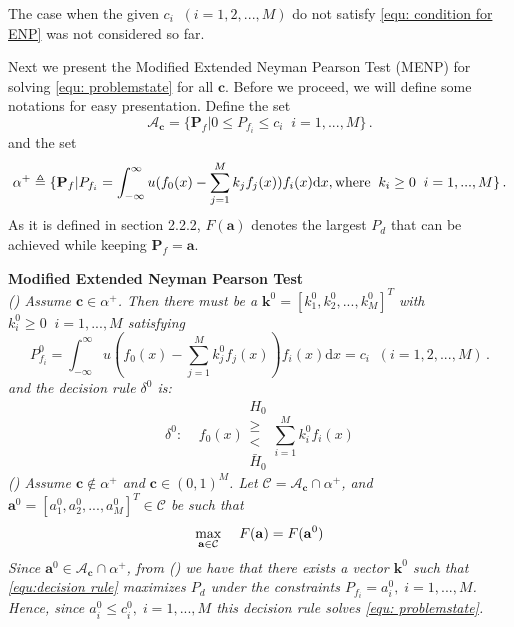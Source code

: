 The case when the given $c_i\;\; (i= 1, 2, ..., M)$ do not satisfy \eqref{equ: condition for ENP} was not considered so far. 


Next we present the Modified Extended Neyman Pearson Test (MENP) for solving \eqref{equ: problemstate} for all $\mathbf{c}$.
Before we proceed, we will define some notations for easy presentation.
Define the set 
\[\mathcal{A}_\mathbf{c} = \{
  \mathbf{P}_f | 0 \leq P_{f_i} \leq c_i
  \;\;i=1,  ..., M\}\,.
\]
and the set 
\[
\alpha^+ \triangleq \{\mathbf{P}_f | P_{f_i} = \int_{-\infty}^{\infty} u(f_0(x) - \sum_{j=1}^{M}k_j f_j(x)) f_i(x) \mathrm{d}x, \text{where\;\;} k_i \geq 0 \;\;i=1, ..., M\}\,.
\]
As it is defined in section 2.2.2, $F(\mathbf{a})$ denotes the largest $P_d$ that can be achieved while keeping $\mathbf{P}_{f} = \mathbf{a}$.  

\noindent \textbf{Modified Extended Neyman Pearson Test}
\noindent \textit{
  \\\textnormal{()} Assume $\mathbf{c} \in \alpha^+$. Then there must be a $\mathbf{k}^0 = [k_1^0, k_2^0, ..., k_M^0]^T$ with $k_i^0 \geq 0\;\;i=1, ..., M$ satisfying
}
\begin{equation}
\label{equ:Pf}
  P_{f_i}^0 = \int_{-\infty}^{\infty} u(f_0(x) - \sum_{j=1}^{M}k_j^0f_j(x))f_i(x)\mathrm{d}x = c_i \;\; (i= 1, 2, ..., M)\,.
\end{equation}
\textit{
    and the decision rule $\delta^0$ is:
}
\begin{equation}
\label{equ:decision rule}
\delta^0:\;\;\;\;f_0(x) \substack{H_0 \\ \geq \\ < \\ \bar{H}_0} \sum_{i=1}^{M}k_i^0f_i(x)
\end{equation}
\textit{
  \noindent \textnormal{()} Assume $\mathbf{c} \notin \alpha^+$ and $\mathbf{c} \in (0, 1)^M$. Let $\mathcal{C} = \mathcal{A}_{\mathbf{c}} \cap \alpha^+$, and $\mathbf{a}^0 = [a_1^0, a_2^0, ..., a_M^0]^T \in \mathcal{C}$ be such that
}
\begin{equation}
\label{equ: F0}
\max_{\mathbf{a} \in \mathcal{C}}\;\;\;\;F(\mathbf{a}) = F(\mathbf{a}^0)\\
\end{equation}
\textit{
Since $\mathbf{a}^0 \in \mathcal{A}_{\mathbf{c}} \cap \alpha^+$, from \textnormal{()} we have that there exists a vector $\mathbf{k}^0$ such that \eqref{equ:decision rule}  maximizes $P_d$ under the constraints $P_{f_i} = a_i^0, \;i=1, ..., M$. Hence, since $a_i^0 \leq c_i^0, \;i=1, ..., M$ this decision rule solves \eqref{equ: problemstate}.
}

